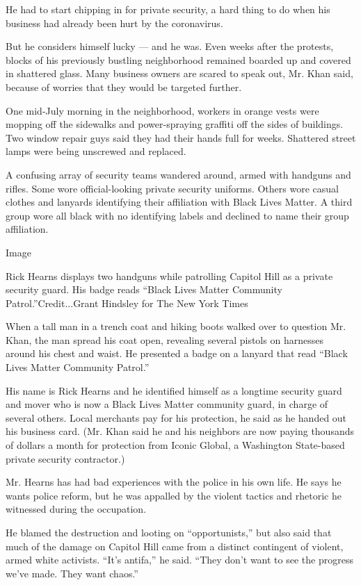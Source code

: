 He had to start chipping in for private security, a hard thing to do
when his business had already been hurt by the coronavirus.

But he considers himself lucky --- and he was. Even weeks after the
protests, blocks of his previously bustling neighborhood remained
boarded up and covered in shattered glass. Many business owners are
scared to speak out, Mr. Khan said, because of worries that they would
be targeted further.

One mid-July morning in the neighborhood, workers in orange vests were
mopping off the sidewalks and power-spraying graffiti off the sides of
buildings. Two window repair guys said they had their hands full for
weeks. Shattered street lamps were being unscrewed and replaced.

A confusing array of security teams wandered around, armed with handguns
and rifles. Some wore official-looking private security uniforms. Others
wore casual clothes and lanyards identifying their affiliation with
Black Lives Matter. A third group wore all black with no identifying
labels and declined to name their group affiliation.

Image

Rick Hearns displays two handguns while patrolling Capitol Hill as a
private security guard. His badge reads ``Black Lives Matter Community
Patrol.''Credit...Grant Hindsley for The New York Times

When a tall man in a trench coat and hiking boots walked over to
question Mr. Khan, the man spread his coat open, revealing several
pistols on harnesses around his chest and waist. He presented a badge on
a lanyard that read ``Black Lives Matter Community Patrol.''

His name is Rick Hearns and he identified himself as a longtime security
guard and mover who is now a Black Lives Matter community guard, in
charge of several others. Local merchants pay for his protection, he
said as he handed out his business card. (Mr. Khan said he and his
neighbors are now paying thousands of dollars a month for protection
from Iconic Global, a Washington State-based private security
contractor.)

Mr. Hearns has had bad experiences with the police in his own life. He
says he wants police reform, but he was appalled by the violent tactics
and rhetoric he witnessed during the occupation.

He blamed the destruction and looting on ``opportunists,'' but also said
that much of the damage on Capitol Hill came from a distinct contingent
of violent, armed white activists. ``It's antifa,'' he said. ``They
don't want to see the progress we've made. They want chaos.''

